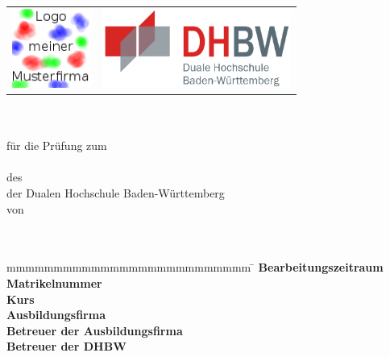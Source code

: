 \begin{titlepage}
	\begin{longtable}{p{} p{}}
	  {\includegraphics[height=2.6cm]{images/logo.png}} & 
	  {\includegraphics[height=2.6cm]{images/dhbw.png}}
	\end{longtable}
	\enlargethispage{20mm}
	\begin{center}
	  \vspace*{12mm}	{\LARGE\bf \titel }\\
	  \vspace*{12mm}	{\large\bf \arbeit}\\
	  \vspace*{12mm}	für die Prüfung zum\\
	  \vspace*{3mm} 	{\bf \abschluss}\\
	  \vspace*{12mm}	des \studiengang\\
	  \vspace*{3mm} 	der Dualen Hochschule Baden-Württemberg \dhbw\\
	  \vspace*{12mm}	von\\
	  \vspace*{3mm} 	{\large\bf \autor}\\
	  \vspace*{12mm}	\datumVonBis\\
	\end{center}
	\vfill
	\begin{spacing}{1.2}
	\begin{tabbing}
		mmmmmmmmmmmmmmmmmmmmmmmmmm                \= \kill
		\textbf{Bearbeitungszeitraum}             \>  \zeitraum\\
		\textbf{Matrikelnummer}                   \>  \martrikelnr\\
		\textbf{Kurs}                             \>  \kurs\\
		\textbf{Ausbildungsfirma}                 \>  \firma\\
		\textbf{Betreuer der Ausbildungsfirma}    \>  \betreuer\\
		\textbf{Betreuer der DHBW}                \>  \betreuerDHBW
	\end{tabbing}
	\end{spacing}
\end{titlepage}
